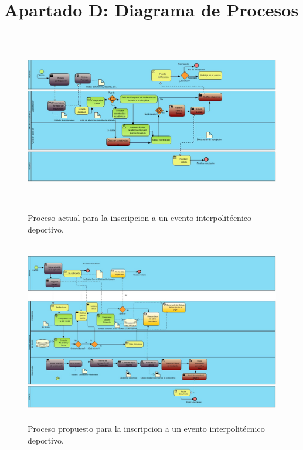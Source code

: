 	\chapter{Apartado D: Diagrama de Procesos}	
		
		\begin{figure}[hbt!]
			\centering
			\includegraphics[width=16cm, height=8cm]{Imagenes/Disenos/ProcesoInscripcionActual.jpg}
			\caption{Proceso actual para la inscripcion a un evento interpolitécnico deportivo.}
			\label{ProcesoInscripcionActual}
		\end{figure}
	\pagebreak
	
		\begin{figure}[hbt!]
			\centering
			\includegraphics[width=16cm, height=8cm]{Imagenes/Disenos/ProcesoInscripcionPropuesto.jpg}
			\caption{Proceso propuesto para la inscripcion a un evento interpolitécnico deportivo.}
			\label{ProcesoInscripcionPropuesto}
		\end{figure}
	
	
